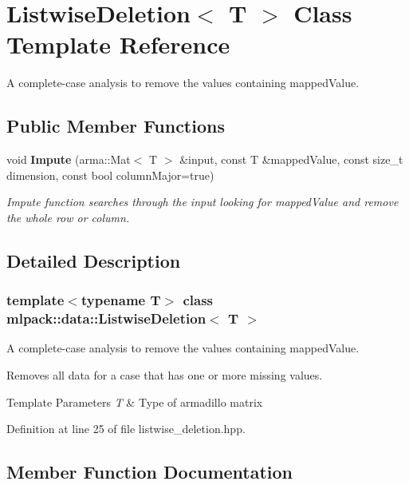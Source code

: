 \section{Listwise\+Deletion$<$ T $>$ Class Template Reference}
\label{classmlpack_1_1data_1_1ListwiseDeletion}


A complete-\/case analysis to remove the values containing mapped\+Value.  


\subsection*{Public Member Functions}
\begin{DoxyCompactItemize}
\item 
void \textbf{ Impute} (arma\+::\+Mat$<$ T $>$ \&input, const T \&mapped\+Value, const size\+\_\+t dimension, const bool column\+Major=true)
\begin{DoxyCompactList}\small\item\em Impute function searches through the input looking for mapped\+Value and remove the whole row or column. \end{DoxyCompactList}\end{DoxyCompactItemize}


\subsection{Detailed Description}
\subsubsection*{template$<$typename T$>$\newline
class mlpack\+::data\+::\+Listwise\+Deletion$<$ T $>$}

A complete-\/case analysis to remove the values containing mapped\+Value. 

Removes all data for a case that has one or more missing values. 
\begin{DoxyTemplParams}{Template Parameters}
{\em T} & Type of armadillo matrix \\
\hline
\end{DoxyTemplParams}


Definition at line 25 of file listwise\+\_\+deletion.\+hpp.



\subsection{Member Function Documentation}
\mbox{\label{classmlpack_1_1data_1_1ListwiseDeletion_a94b8353ed4d68b10e2dd59d5e7dc15ca}} 
